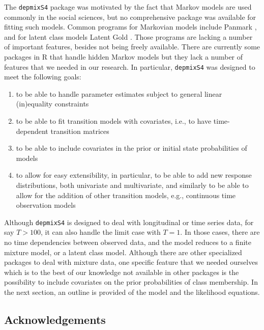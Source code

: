 \documentclass[a4paper]{article}
\newcommand{\pkg}{\texttt}
\begin{document}
The \pkg{depmixS4} package was motivated by the fact that Markov models
are used commonly in the social sciences, but no comprehensive package
was available for fitting such models.  Common programs for Markovian
models include Panmark \citep{Pol1996}, and for latent class models
Latent Gold \citep{Vermunt2003}.  Those programs are lacking a number
of important features, besides not being freely available.  There are
currently some packages in R that handle hidden Markov models but they
lack a number of features that we needed in our research.  In
particular, \pkg{depmixS4} was designed to meet the following goals: 
\begin{enumerate}
	
	\item to be able to handle parameter estimates subject to general
	linear (in)equality constraints
	
	\item to be able to fit transition models with covariates, i.e.,
	to have time-dependent transition matrices
	
	\item to be able to include covariates in the prior or initial
	state probabilities of models
	
	\item to allow for easy extensibility, in particular, to be able
	to add new response distributions, both univariate and
	multivariate, and similarly to be able to allow for the addition
	of other transition models, e.g., continuous time observation
	models
	
\end{enumerate}

Although \pkg{depmixS4} is designed to deal with
longitudinal or time series data, for say $T>100$, it can also handle
the limit case with $T=1$.  In those cases, there are no time
dependencies between observed data, and the model reduces to a finite
mixture model, or a latent class model.  Although there are other
specialized packages to deal with mixture data, one specific feature
that we needed ourselves which is to the best of our knowledge not
available in other packages is the possibility to include covariates
on the prior probabilities of class membership.  In the next section,
an outline is provided of the model and the likelihood equations.  

\subsection*{Acknowledgements} 
\end{document}
